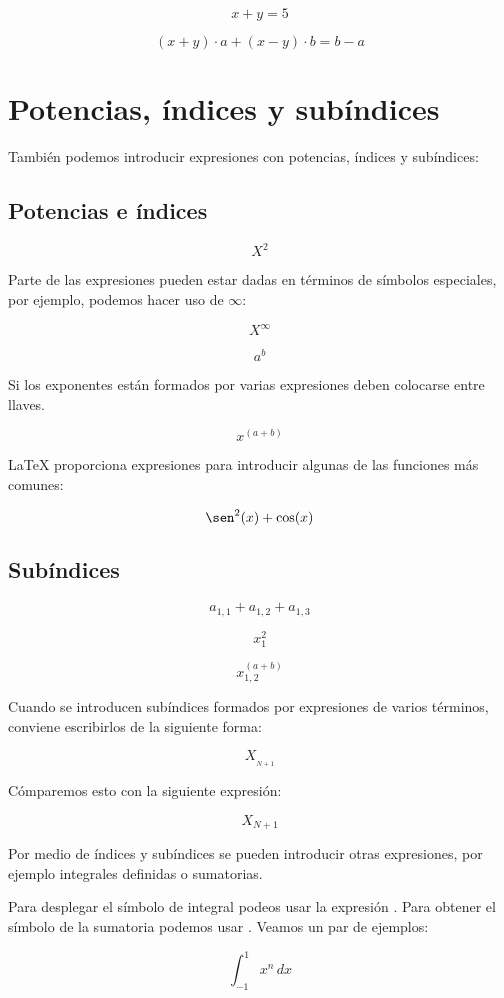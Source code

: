 \documentclass[letterpaper,12pt]{article}
\begin{document}
\[ x + y = 5 \]

\[ (x + y)\cdot a + (x-y)\cdot b = b - a \]

\section{Potencias, índices y subíndices}

También podemos introducir expresiones con potencias, índices y subíndices:

\subsection{Potencias e índices}

$$ X^2 $$

Parte de las expresiones pueden estar dadas en términos de símbolos especiales, por ejemplo, podemos hacer
uso de $\infty$:

$$ X^\infty $$

$$ a^b $$

Si los exponentes están formados por varias expresiones deben colocarse entre llaves.

$$ x^{(a + b)} $$

\LaTeX{} proporciona expresiones para introducir algunas de las funciones más comunes:

$$ \sen^2(x) + \cos(x) $$

\subsection{Subíndices}

$$ a_{1,1} + a_{1,2} + a_{1,3} $$

$$ x_1^2 $$

$$ x_{1,2}^{(a + b)} $$

Cuando se introducen subíndices formados por expresiones de varios términos, conviene escribirlos 
de la siguiente forma:

$$ X_{_{N+1}} $$

Cómparemos esto con la siguiente expresión:

$$ X_{N+1} $$

Por medio de índices y subíndices se pueden introducir otras expresiones, por ejemplo integrales definidas
o sumatorias. 

Para desplegar el símbolo de integral podeos usar la expresión \verb@\int@. Para obtener el símbolo de la
sumatoria podemos usar \verb@\sum@. Veamos un par de ejemplos:

$$ \int_{-1}^{1} x^n \, dx $$
\end{document}
